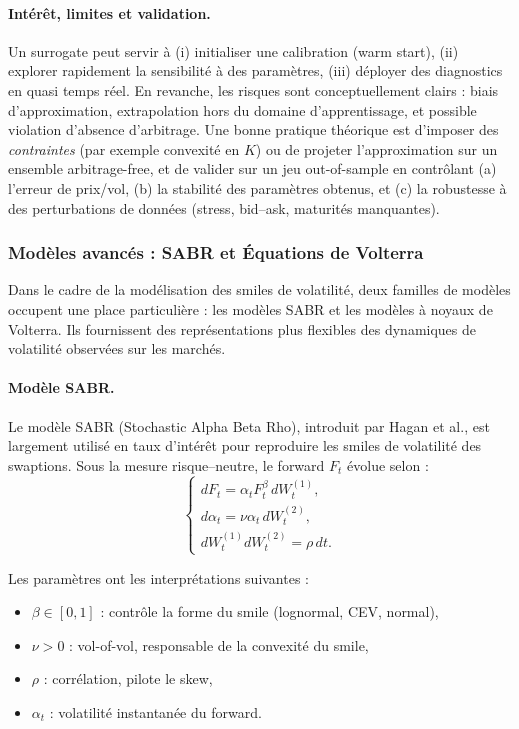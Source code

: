 \documentclass[11pt,a4paper]{article}
\newcommand{\1}{\mathbf{1}}
\begin{document}
\paragraph{Int\'er\^et, limites et validation.}
Un surrogate peut servir \`a (i) initialiser une calibration (warm start), (ii) explorer rapidement
la sensibilit\'e \`a des param\`etres, (iii) d\'eployer des diagnostics en quasi temps r\'eel. En revanche,
les risques sont conceptuellement clairs : biais d'approximation, extrapolation hors du domaine d'apprentissage,
et possible violation d'absence d'arbitrage. Une bonne pratique th\'eorique est d'imposer des \emph{contraintes}
(par exemple convexit\'e en $K$) ou de projeter l'approximation sur un ensemble arbitrage-free, et de valider
sur un jeu out-of-sample en contr\^olant (a) l'erreur de prix/vol, (b) la stabilit\'e des param\`etres obtenus,
et (c) la robustesse \`a des perturbations de donn\'ees (stress, bid--ask, maturit\'es manquantes).


\subsubsection{Mod\`eles avanc\'es : SABR et \'Equations de Volterra}

Dans le cadre de la mod\'elisation des smiles de volatilité, deux familles de
mod\`eles occupent une place particuli\`ere : les mod\`eles SABR et les
mod\`eles \`a noyaux de Volterra. Ils fournissent des repr\'esentations plus
flexibles des dynamiques de volatilité observées sur les march\'es.

\paragraph{Mod\`ele SABR.}

Le mod\`ele SABR (Stochastic Alpha Beta Rho), introduit par Hagan et al., est
largement utilis\'e en taux d'int\'er\^et pour reproduire les smiles de
volatilit\'e des swaptions. Sous la mesure risque--neutre, le forward $F_t$
\'evolue selon :
\[
\begin{cases}
dF_t = \alpha_t F_t^{\beta}\, dW_t^{(1)}, \\[4pt]
d\alpha_t = \nu \alpha_t\, dW_t^{(2)}, \\[4pt]
dW_t^{(1)} dW_t^{(2)} = \rho\, dt.
\end{cases}
\]

Les param\`etres ont les interpr\'etations suivantes :
\begin{itemize}
  \item $\beta \in [0,1]$ : contr\^ole la forme du smile (lognormal, CEV, normal),
  \item $\nu > 0$ : vol-of-vol, responsable de la convexit\'e du smile,
  \item $\rho$ : corr\'elation, pilote le skew,
  \item $\alpha_t$ : volatilité instantanée du forward.
\end{itemize}
\end{document}
